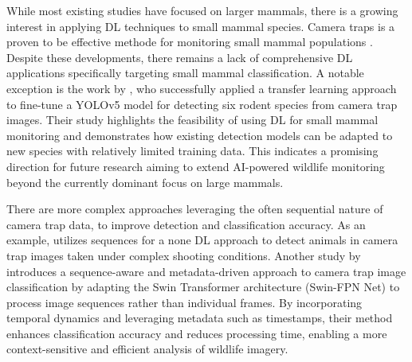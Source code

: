 While most existing studies have focused on larger mammals, there is a growing interest in applying \ac{DL} techniques to small mammal species.
Camera traps is a proven to be effective methode for monitoring small mammal populations \autocite{clucasCameraTrapMethod2025,aegerterMonitoringKleinmustelidenSchlaefern2019,littlewoodUseNovelCamera2021}.
Despite these developments, there remains a lack of comprehensive \ac{DL} applications specifically targeting small mammal classification.
A notable exception is the work by \textcite{hopkinsDetectingMonitoringRodents2024}, who successfully applied a transfer learning approach to fine-tune a YOLOv5 model for detecting six rodent species from camera trap images.
Their study highlights the feasibility of using \ac{DL} for small mammal monitoring and demonstrates how existing detection models can be adapted to new species with relatively limited training data.
This indicates a promising direction for future research aiming to extend \ac{AI}-powered wildlife monitoring beyond the currently dominant focus on large mammals.

There are more complex approaches leveraging the often sequential nature of camera trap data, to improve detection and classification accuracy.
As an example, \textcite{zotinANIMALDETECTIONUSING2019} utilizes sequences for a none \ac{DL} approach to detect animals in camera trap images taken under complex shooting conditions.
Another study by \textcite{muhammadTemporalSwinFPNNetNovel2024} introduces a sequence-aware and metadata-driven approach to camera trap image classification by adapting the Swin Transformer architecture (Swin-FPN Net) to process image sequences rather than individual frames. 
By incorporating temporal dynamics and leveraging metadata such as timestamps, their method enhances classification accuracy and reduces processing time, enabling a more context-sensitive and efficient analysis of wildlife imagery.
